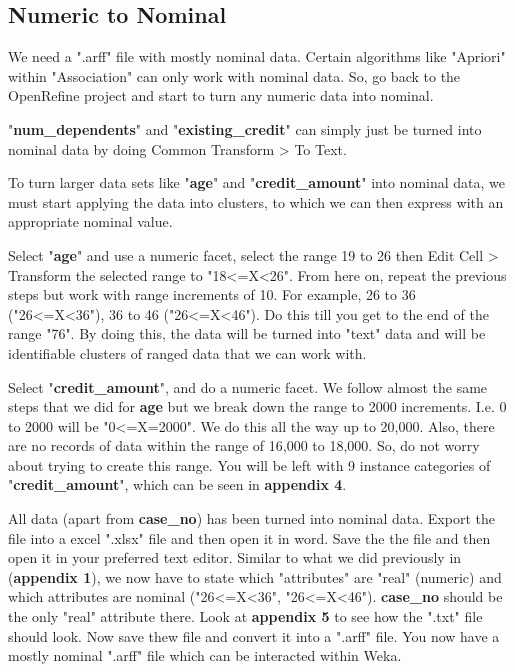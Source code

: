 \documentclass[12pt, a4paper]{article}
\begin{document}
    \subsection{Numeric to Nominal}
    We need a ".arff" file with mostly nominal data. Certain algorithms like "Apriori" within "Association" can only work with nominal data. So, go back to the OpenRefine project and start to turn any numeric data into nominal.
    
    "\textbf{num\_dependents}" and "\textbf{existing\_credit}" can simply just be turned into nominal data by doing Common Transform > To Text.
    
    To turn larger data sets like "\textbf{age}" and "\textbf{credit\_amount}" into nominal data, we must start applying the data into clusters, to which we can then express with an appropriate nominal value.
    
    Select "\textbf{age}" and use a numeric facet, select the range 19 to 26 then  Edit Cell > Transform the selected range to "18<=X<26". From here on, repeat the previous steps but work with range increments of 10. For example,  26 to 36 ("26<=X<36"), 36 to 46 ("26<=X<46"). Do this till you get to the end of the range "76". By doing this, the data will be turned into "text" data and will be identifiable clusters of ranged data that we can work with.
    
    Select "\textbf{credit\_amount}", and do a numeric facet. We follow almost the same steps that we did for \textbf{age} but we break down the range to 2000 increments. I.e. 0 to 2000 will be "0<=X=2000". We do this all the way up to 20,000. Also, there are no records of data within the range of 16,000 to 18,000. So, do not worry about trying to create this range. You will be left with 9 instance categories of "\textbf{credit\_amount}", which can be seen in \textbf{appendix 4}.
    
    All data (apart from \textbf{case\_no}) has been turned into nominal data. Export the file into a excel ".xlsx" file and then open it in word. Save the the file and then open it in your preferred text editor. Similar to what we did previously in (\textbf{appendix 1}), we now have to state which "attributes" are "real" (numeric) and which attributes are  nominal ({"26<=X<36", "26<=X<46"}). \textbf{case\_no} should be the only "real" attribute there. Look at \textbf{appendix 5} to see how the ".txt" file should look. Now save thew file and convert it into a ".arff" file. You now have a mostly nominal ".arff" file which can be interacted within Weka.
    
\end{document}
